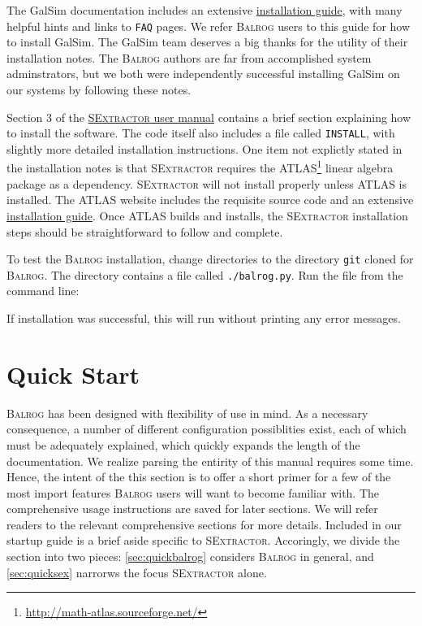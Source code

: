 \documentclass[12pt]{book}
\newcommand{\codett}[1]{\lstinline{#1}}
\newcommand{\galsim}{GalSim}
\newcommand{\balrog}{\textsc{Balrog}}
\newcommand{\sex}{\textsc{SExtractor}}
\begin{document}
The \galsim{} documentation includes an extensive
\href{https://github.com/GalSim-developers/GalSim/blob/releases/1.0/INSTALL.md}{installation guide},
with many helpful hints and links to \codett{FAQ} pages. 
We refer \balrog{} users to this guide for how to install \galsim{}.
The \galsim{} team deserves a big thanks for the utility of their installation notes.
The \balrog{} authors are far from accomplished system adminstrators, 
but we both were independently successful installing \galsim{} on our systems by following these notes.

Section 3 of the \href{https://www.astromatic.net/pubsvn/software/sextractor/trunk/doc/sextractor.pdf}{\sex{} user manual}
contains a brief section explaining how to install the software. The code itself also includes a file called \codett{INSTALL}, with
slightly more detailed installation instructions.
One item not explictly stated in the installation notes is that \sex{} requires the ATLAS\footnote{\url{http://math-atlas.sourceforge.net/}}
linear algebra package as a dependency.
\sex{} will not install properly unless ATLAS is installed. 
The ATLAS website includes the requisite source code and
an extensive \href{http://math-atlas.sourceforge.net/atlas_install/}{installation guide}.
Once ATLAS builds and installs, the \sex{} installation steps should be straightforward to follow and complete.

To test the \balrog{} installation, change directories to the directory \codett{git} cloned for \balrog{}.
The directory contains a file called \codett{./balrog.py}. Run the file from the command line:

\begin{cmdline}
\end{cmdline}

\noindent If installation was successful, this will run without printing any error messages.

\chapter{Quick Start}
\label{sec:quick}

\balrog{} has been designed with flexibility of use in mind. As a necessary consequence, 
a number of different configuration possiblities exist, each of which must be
adequately explained, which quickly expands the length of the documentation.
We realize parsing the entirity of this manual requires some time.
Hence, the intent of the this section is to offer a short primer for a few of the most import features
\balrog{} users will want to become familiar with.
The comprehensive usage instructions are saved for later sections.
We will refer readers to the relevant comprehensive sections for more details.
Included in our startup guide is a brief aside specific to \sex{}.
Accoringly, we divide the section into two pieces:
\autoref{sec:quickbalrog} considers \balrog{} in general,
and \autoref{sec:quicksex} narrorws the focus \sex{} alone.
\end{document}
